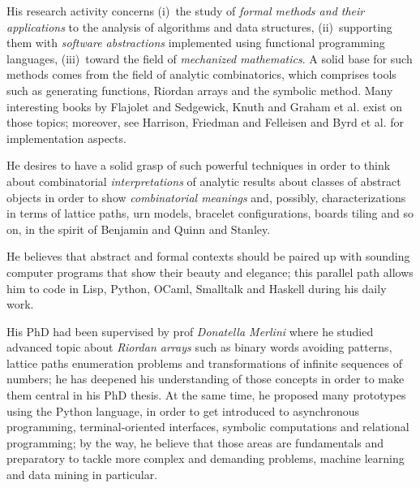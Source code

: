 \documentclass[a4paper]{tufte-handout}
\begin{document}
    His research activity concerns (i)~the study of \textit{formal methods
    and their applications} to the analysis of algorithms and data structures,
    (ii)~supporting them with \textit{software abstractions} implemented using functional
    programming languages, (iii)~toward the field of \textit{mechanized mathematics}.  
    A solid base for such methods comes from the field
    of analytic combinatorics, which comprises tools such as generating
    functions, Riordan arrays and the symbolic method. Many interesting books
    by Flajolet and Sedgewick,
    Knuth and Graham et al.  exist on those topics; moreover,  see
    Harrison, Friedman and Felleisen
     and
    Byrd et al. for implementation aspects. 

    He desires to have a solid grasp of such powerful techniques in order to
    think about combinatorial \emph{interpretations} of
    analytic results about classes of abstract objects in order to show
    \emph{combinatorial meanings} and, possibly, characterizations in terms
    of lattice paths, urn models, bracelet configurations, boards
    tiling and so on, in the spirit of Benjamin and Quinn  and Stanley.

    He believes that abstract and formal contexts should be paired up with
    sounding computer programs that show their beauty and elegance; this
    parallel path allows him to code in Lisp, Python, OCaml, Smalltalk and
    Haskell during his daily work.

    His PhD had been supervised by prof \textit{Donatella Merlini} where he
    studied advanced topic about \textit{Riordan arrays} such as binary words
    avoiding patterns, lattice paths enumeration problems and transformations
    of infinite sequences of numbers; he has deepened his understanding of
    those concepts in order to make them central in his PhD thesis. At the same
    time, he proposed many prototypes using the Python language, in order to
    get introduced to asynchronous programming, terminal-oriented interfaces,
    symbolic computations and relational programming; by the way, he believe
    that those areas are fundamentals and preparatory to tackle more complex
    and demanding problems, machine learning and data mining in particular.
\end{document}
